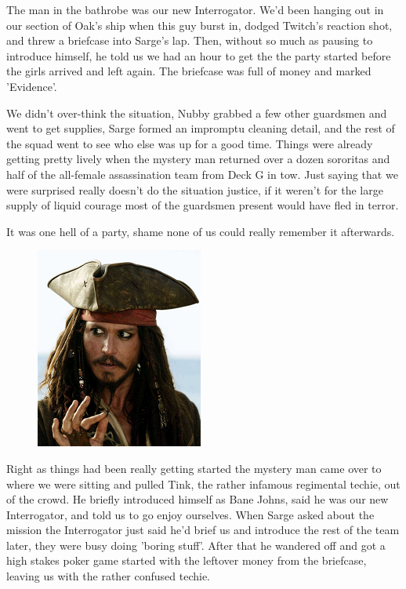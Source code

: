 The man in the bathrobe was our new Interrogator. 
We'd been hanging out in our section of Oak's ship when this guy burst in, dodged Twitch's reaction shot, and threw a briefcase into Sarge's lap. 
Then, without so much as pausing to introduce himself, he told us we had an hour to get the the party started before the girls arrived and left again. 
The briefcase was full of money and marked 'Evidence'.

We didn't over-think the situation, Nubby grabbed a few other guardsmen and went to get supplies, Sarge formed an impromptu cleaning detail, and the rest of the squad went to see who else was up for a good time. 
Things were already getting pretty lively when the mystery man returned over a dozen sororitas and half of the all-female assassination team from Deck G in tow. 
Just saying that we were surprised really doesn't do the situation justice, if it weren't for the large supply of liquid courage most of the guardsmen present would have fled in terror.

It was one hell of a party, shame none of us could really remember it afterwards.

\begin{figure}
	\begin{center}
		\includegraphics[width=\figwidth]{pics/9/4.png}
	\end{center}
\end{figure}
Right as things had been really getting started the mystery man came over to where we were sitting and pulled Tink, the rather infamous regimental techie, out of the crowd. 
He briefly introduced himself as Bane Johns, said he was our new Interrogator, and told us to go enjoy ourselves. 
When Sarge asked about the mission the Interrogator just said he'd brief us and introduce the rest of the team later, they were busy doing 'boring stuff'. 
After that he wandered off and got a high stakes poker game started with the leftover money from the briefcase, leaving us with the rather confused techie.

